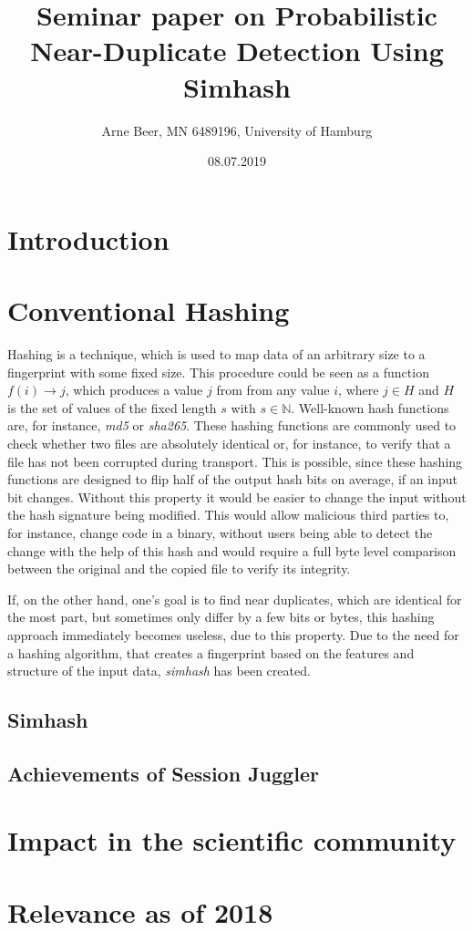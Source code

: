 \documentclass[12pt,twocolumn,a4paper,DIV=calc]{scrartcl}
\begin{document}
\title{Seminar paper on Probabilistic Near-Duplicate Detection Using Simhash}
\author{Arne Beer, MN 6489196, University of Hamburg}
\date{08.07.2019}

\maketitle


\section{Introduction}


\section{Conventional Hashing}

Hashing is a technique, which is used to map data of an arbitrary size to a fingerprint with some fixed size.
This procedure could be seen as a function  $f(i) \rightarrow j$, which produces a value $j$ from from any value $i$, where $j \in H$ and $H$ is the set of values of the fixed length $s$ with $s \in \mathbb{N}$.
Well-known hash functions are, for instance, \emph{md5} or \emph{sha265}.
These hashing functions are commonly used to check whether two files are absolutely identical or, for instance, to verify that a file has not been corrupted during transport.
This is possible, since these hashing functions are designed to flip half of the output hash bits on average, if an input bit changes.
Without this property it would be easier to change the input without the hash signature being modified.
This would allow malicious third parties to, for instance, change code in a binary, without users being able to detect the change with the help of this hash and would require a full byte level comparison between the original and the copied file to verify its integrity.

If, on the other hand, one's goal is to find near duplicates, which are identical for the most part, but sometimes only differ by a few bits or bytes, this hashing approach immediately becomes useless, due to this property.
Due to the need for a hashing algorithm, that creates a fingerprint based on the features and structure of the input data, \emph{simhash} has been created.


\subsection{Simhash}


\subsection{}



\subsection{Achievements of Session Juggler}


\section{Impact in the scientific community}


\section{Relevance as of 2018}


\printbibliography
\end{document}
